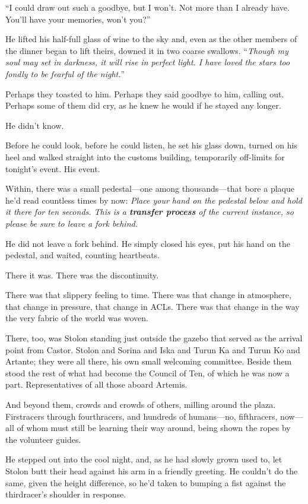 ``I could draw out such a goodbye, but I won't. Not more than I already have. You'll have your memories, won't you?''

He lifted his half-full glass of wine to the sky and, even as the other members of the dinner began to lift theirs, downed it in two coarse swallows. ``\emph{Though my soul may set in darkness, it will rise in perfect light. I have loved the stars too fondly to be fearful of the night.}''

Perhaps they toasted to him. Perhaps they said goodbye to him, calling out. Perhaps some of them did cry, as he knew he would if he stayed any longer.

He didn't know.

Before he could look, before he could listen, he set his glass down, turned on his heel and walked straight into the customs building, temporarily off-limits for tonight's event. His event.

Within, there was a small pedestal—one among thousands—that bore a plaque he'd read countless times by now: \emph{Place your hand on the pedestal below and hold it there for ten seconds. This is a \textbf{transfer process} of the current instance, so please be sure to leave a fork behind.}

He did not leave a fork behind. He simply closed his eyes, put his hand on the pedestal, and waited, counting heartbeats.

There it was. There was the discontinuity.

There was that slippery feeling to time. There was that change in atmosphere, that change in pressure, that change in ACLs. There was that change in the way the very fabric of the world was woven.

There, too, was Stolon standing just outside the gazebo that served as the arrival point from Castor. Stolon and Sorina and Iska and Turun Ka and Turun Ko and Artante; they were all there, his own small welcoming committee. Beside them stood the rest of what had become the Council of Ten, of which he was now a part. Representatives of all those aboard Artemis.

And beyond them, crowds and crowds of others, milling around the plaza. Firstracers through fourthracers, and hundreds of humans—no, fifthracers, now—all of whom must still be learning their way around, being shown the ropes by the volunteer guides.

He stepped out into the cool night, and, as he had slowly grown used to, let Stolon butt their head against his arm in a friendly greeting. He couldn't do the same, given the height difference, so he'd taken to bumping a fist against the thirdracer's shoulder in response.

